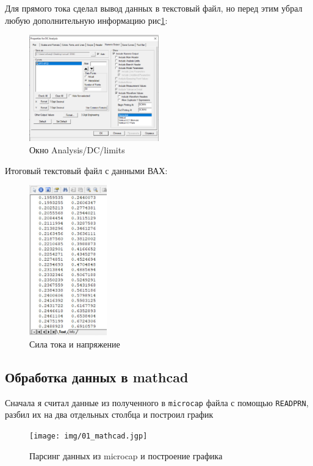 	\clearpage
	\noindent Для прямого тока сделал вывод данных в текстовый файл, но перед этим убрал любую дополнительную информацию рис\ref{fig:06_main_mcp}: 
	\begin{figure}[H]
		\centering
		\includegraphics[width=0.5\textwidth]{img/06_main_mcp.jpg}
		\captionsetup{font=footnotesize}
		\caption{Окно Analysis/DC/limits}
		\label{fig:06_main_mcp}
	\end{figure}
	\noindent Итоговый текстовый файл с данными ВАХ:
	\begin{figure}[H]
		\centering
		\includegraphics[width=0.3\textwidth]{img/04_main_mcp.jpg}
		\captionsetup{font=footnotesize}
		\caption{Сила тока и напряжение}
		\label{fig:04_main_mcp}
	\end{figure}
\newpage
\subsection{Обработка данных в mathcad}
\noindent Сначала я считал данные из полученного в \texttt{microcap} файла с помощью \texttt{READPRN}, разбил их на два отдельных столбца и построил график 

\begin{figure}[H]
	\centering
	\texttt{[image: img/01\_mathcad.jgp]}
	\captionsetup{font=footnotesize}
	\caption{Парсинг данных из microcap и построение графика}
	\label{fig:01_mathcad}
\end{figure}

